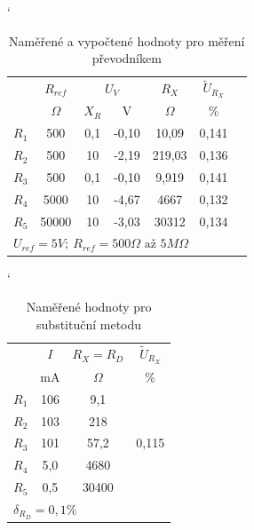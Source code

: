 \documentclass[a4paper, czech]{article}
\begin{document}
\begin{table}[H]
    \catcode`
    \centering
    \caption{Naměřené a vypočtené hodnoty pro měření převodníkem}
    \begin{tabular}{lcccccc}
        \toprule
        \multirow{2}{*}{} & $R_{ref}$ & \multicolumn{2}{c}{$U_V$} & $R_X$   & $\tilde{U}_{R_X}$ \\
        \cmidrule(rl){2-2} 
        \cmidrule(rl){3-4}
        \cmidrule(rl){5-5}
        \cmidrule(rl){6-6}
        & $\Omega$      & $X_R$         & V           & $\Omega$      & \%      \\ 
        \midrule
        $R_1$                & 500    & 0,1        & -0,10       & 10,09  & 0,141   \\ 
        $R_2$                & 500    & 10         & -2,19       & 219,03 & 0,136   \\ 
        $R_3$                & 500    & 0,1        & -0,10       & 9,919  & 0,141   \\ 
        $R_4$                & 5000   & 10         & -4,67       & 4667   & 0,132   \\ 
        $R_5$                & 50000  & 10         & -3,03       & 30312  & 0,134   \\ 
        \bottomrule
        \multicolumn{6}{l}{$U_{ref} = 5V;\ R_{ref} = 500 \Omega \text{ až } 5 M \Omega$}
    \end{tabular}
\end{table}

\begin{table}[H]
    \catcode`
    \centering
    \caption{Naměřené hodnoty pro substituční metodu}
    \begin{tabular}{lccc}
        \toprule
        \multirow{2}{*}{} & $I$   & $R_X = R_D$ & $\tilde{U}_{R_X}$                \\
        \cmidrule(rl){2-2}
        \cmidrule(rl){3-3}
        \cmidrule(rl){4-4}
                                     & mA  & $\Omega$           & \%                     \\
        \midrule
        $R_1$                           & 106 & 9,1         & \multirow{5}{*}{0,115} \\
        $R_2$                           & 103 & 218         &                        \\
        $R_3$                           & 101 & 57,2        &                        \\
        $R_4$                           & 5,0   & 4680        &                        \\
        $R_5$                           & 0,5 & 30400       &                       \\
        \bottomrule
        \multicolumn{4}{l}{$\delta_{R_D} = 0,1\%$}
    \end{tabular}
\end{table}
\end{document}
